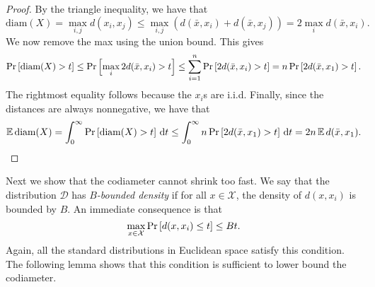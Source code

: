 \documentclass[../main.tex]{subfiles}
\newcommand{\set}[1]{\mathcal {#1}}
\newcommand{\distribution}[1]{\mathcal {#1}}
\newcommand{\dist}[2]{\distf({#1},{#2})}
\newcommand{\distf}{d}
\newcommand{\diam}[1]{\text{diam}({#1})}
\begin{document}
\begin{proof}
    By the triangle inequality, we have that
    \begin{equation*}
        \diam{X}
        = 
        \max_{i,j} \dist{x_i}{x_j}
        \le
        \max_{i,j} (\dist{\bar x}{x_i} + \dist{\bar x}{x_j})
        =
        2\max_i \dist{\bar x}{x_i}
        .
    \end{equation*}
    We now remove the max using the union bound.
    This gives
    \begin{equation*}
        \prob{\diam{X} > t}
        \le
        \prob{\max_i 2\dist{\bar x}{x_i} > t}
        \le
        \sum_{i=1}^n\prob{2\dist{\bar x}{x_i} > t}
        \label{eq:Ediamub}
        =
        n\prob{2\dist{\bar x}{x_1} > t}
        .
    \end{equation*}
    The rightmost equality follows because the $x_i$s are i.i.d.
    Finally, since the distances are always nonnegative, we have that
    \begin{equation*}
        \E\diam{X} 
        = 
        \int_0^\infty \prob{\diam{X} > t} \dd t
        \le
        \int_0^\infty n\prob{2\dist{\bar x}{x_1} > t} \dd t
        =
        2n \E\dist{\bar x}{x_1}
        .
    \end{equation*}
\end{proof}


Next we show that the codiameter cannot shrink too fast.
We say that the distribution $\distribution D$ has \emph{$B$-bounded density} if
for all $x\in\set X$, the density of $\dist{x}{x_i}$ is bounded by $B$.
An immediate consequence is that 
\begin{equation}
    \max_{x\in\set X} \prob{\dist{x}{x_i} \le t} \le Bt
    .
\end{equation}
Again, all the standard distributions in Euclidean space satisfy this condition.
The following lemma shows that this condition is sufficient to lower bound the codiameter.
\end{document}
